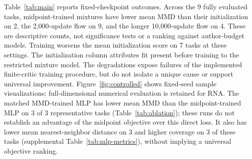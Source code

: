 Table~\ref{tab:main} reports fixed-checkpoint outcomes. Across the 9 fully evaluated tasks, midpoint-trained mixtures have lower mean MMD than their initialization on 2, the 2,000-update flow on 9, and the longer 10,000-update flow on 4. These are descriptive counts, not significance tests or a ranking against author-budget models. Training worsens the mean initialization score on 7 tasks at these settings. The initialization column attributes fit present before training to the restricted mixture model. The degradations expose failures of the implemented finite-critic training procedure, but do not isolate a unique cause or support universal improvement. Figure~\ref{fig:controlled} shows fixed-seed sample visualizations; full-dimensional numerical evaluation is retained for RNA. The matched MMD-trained MLP has lower mean MMD than the midpoint-trained MLP on 3 of 3 representative tasks (Table~\ref{tab:ablation}); these runs do not establish an advantage of the midpoint objective over this direct loss. It also has lower mean nearest-neighbor distance on 3 and higher coverage on 3 of these tasks (supplemental Table~\ref{tab:mlp-metrics}), without implying a universal objective ranking.



